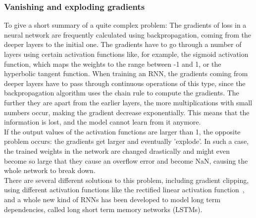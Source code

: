 \documentclass[
a4paper,
pagesize,
pdftex,
12pt,
ngerman,
fleqn,
final,
]{scrartcl}
\begin{document}
	\subsubsection{Vanishing and exploding gradients}
	To give a short summary of a quite complex problem: The gradients of loss in a neural network are frequently calculated using backpropagation, coming from the deeper layers to the initial one. The gradients have to go through a number of layers using certain activation functions like, for example, the sigmoid activation function, which maps the weights to the range between -1 and 1, or the hyperbolic tangent function. When training an RNN, the gradients coming from deeper layers have to pass through continuous operations of this type, since the backpropagation algorithm uses the chain rule to compute the gradients. The further they are apart from the earlier layers, the more multiplications with small numbers occur, making the gradient decrease exponentially. This means that the information is lost, and the model cannot learn from it anymore.\\
	If the output values of the activation functions are larger than 1, the opposite problem occurs: the gradients get larger and eventually 'explode'. In such a case, the trained weights in the network are changed drastically and might even become so large that they cause an overflow error and become NaN, causing the whole network to break down.\\
	There are several different solutions to this problem, including gradient clipping, using different activation functions like the rectified linear activation function~\cite{Glorot.2011}, and a whole new kind of RNNs has been developed to model long term dependencies, called long short term memory networks (LSTMs).
	
\end{document}
